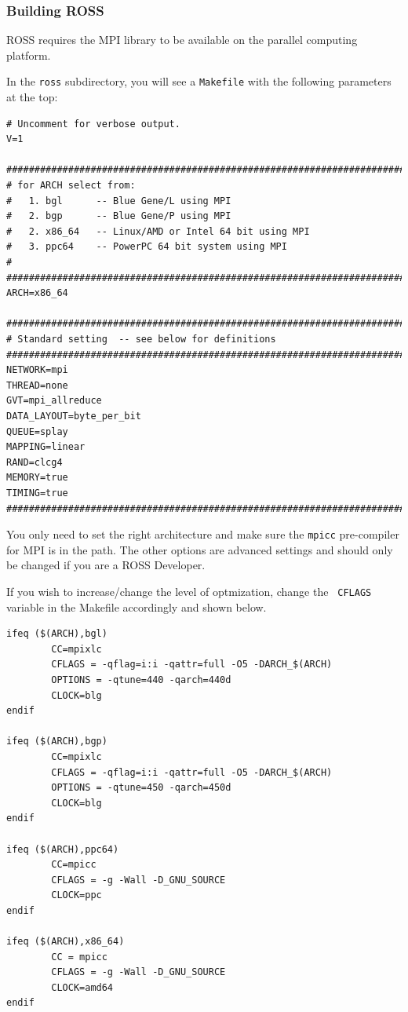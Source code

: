\documentclass[12pt]{article}
\begin{document}
\subsubsection{Building ROSS}
ROSS requires the MPI library to be available on the parallel
computing platform. 

In the {\tt ross} subdirectory, you will see a {\tt Makefile}
with the following parameters at the top:

\begin{verbatim}
# Uncomment for verbose output.
V=1

########################################################################
# for ARCH select from:
#   1. bgl      -- Blue Gene/L using MPI
#   2. bgp      -- Blue Gene/P using MPI
#   2. x86_64   -- Linux/AMD or Intel 64 bit using MPI
#   3. ppc64    -- PowerPC 64 bit system using MPI
#
########################################################################
ARCH=x86_64

########################################################################
# Standard setting  -- see below for definitions
########################################################################
NETWORK=mpi
THREAD=none
GVT=mpi_allreduce
DATA_LAYOUT=byte_per_bit
QUEUE=splay
MAPPING=linear
RAND=clcg4
MEMORY=true
TIMING=true
########################################################################
\end{verbatim}

You only need to set the right architecture and make sure the {\tt mpicc}
pre-compiler for MPI is in the path. The other options are advanced settings
and should only be changed if you are a ROSS Developer.

If you wish to increase/change the level of optmization, change the {\tt
  CFLAGS} variable in the Makefile accordingly and shown below.

\begin{verbatim}
ifeq ($(ARCH),bgl)
        CC=mpixlc
        CFLAGS = -qflag=i:i -qattr=full -O5 -DARCH_$(ARCH)
        OPTIONS = -qtune=440 -qarch=440d
        CLOCK=blg
endif

ifeq ($(ARCH),bgp)
        CC=mpixlc
        CFLAGS = -qflag=i:i -qattr=full -O5 -DARCH_$(ARCH)
        OPTIONS = -qtune=450 -qarch=450d
        CLOCK=blg
endif

ifeq ($(ARCH),ppc64)
        CC=mpicc
        CFLAGS = -g -Wall -D_GNU_SOURCE
        CLOCK=ppc
endif

ifeq ($(ARCH),x86_64)
        CC = mpicc
        CFLAGS = -g -Wall -D_GNU_SOURCE
        CLOCK=amd64
endif
\end{verbatim} 
 
\end{document}
